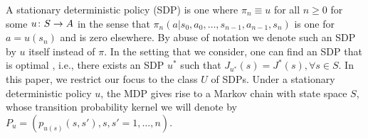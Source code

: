 A stationary deterministic policy (SDP) is one where $\pi_n\equiv u$ for all $n\geq 0$ for some $u\colon S \rightarrow A$
in the sense that $\pi_n(a|s_0,a_0,\dots,s_{n-1},a_{n-1},s_n)$ is one for $a = u(s_n)$ and is zero elsewhere.
By abuse of notation we denote such an SDP by $u$ itself instead of $\pi$. 
In the setting that we consider, one can find an SDP that is optimal \cite{BertB,Puter}, i.e., there exists an SDP $u^*$ such that $J_{u^*}(s)=J^*(s),\forall s\in S$. 
In this paper, we restrict our focus to the class $U$ of SDPs. 
Under a stationary deterministic policy $u$, 
	the MDP gives rise to a Markov chain with state space $S$,
whose  transition probability kernel we will denote
	by $P_u=(p_{u(s)}(s,s'),s,s'=1,\ldots,n)$.  
	
